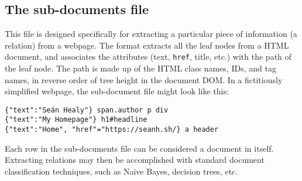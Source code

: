\subsection{The sub-documents file\label{subd}} This file
is designed specifically for extracting a particular piece of
information (a relation)
from a webpage.  The format extracts all the leaf nodes from a HTML
document, and associates the attributes (text, {\tt href}, title,
etc.) with
the path of the leaf node.  The path is made up of the HTML class
names, IDs, and tag names, in reverse order of tree height
in the document DOM. In a fictitiously simplified webpage, the
sub-document file might look
like this:
\begin{verbatim}
{"text":"Seán Healy"} span.author p div
{"text":"My Homepage"} h1#headline
{"text":"Home", "href"="https://seanh.sh/} a header
\end{verbatim}
Each row in the sub-documents file can be considered a document
in itself.  Extracting relations may then be accomplished with
standard document classification techniques, such as Naive Bayes,
decision trees, etc.